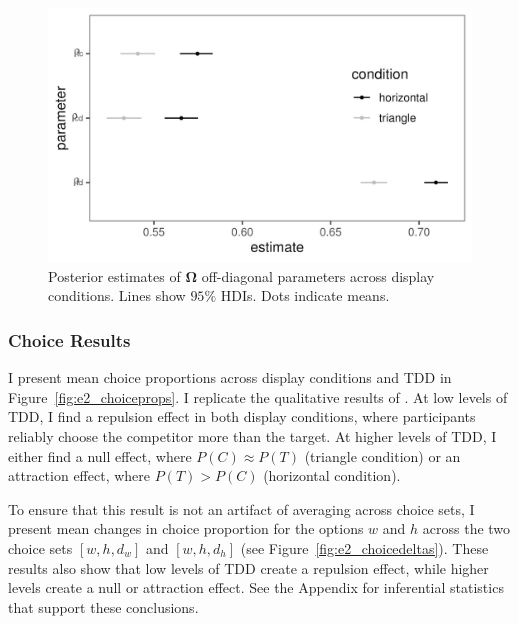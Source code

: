 \begin{figure}
   \includegraphics[width=\textwidth]{figures/bayes_circle_area_sigma_constant_comp_effect_omega_plot.jpeg}
   \caption{Posterior estimates of $\boldsymbol{\Omega}$ off-diagonal parameters across display conditions. Lines show $95\%$ HDIs.  Dots indicate means.}
   \label{fig:e2_omega}
\end{figure}

\subsubsection{Choice Results}

I present mean choice proportions across display conditions and TDD in Figure~\ref{fig:e2_choiceprops}. I replicate the qualitative results of \textcite{spektorWhenGoodLooks2018b}. At low levels of TDD, I find a repulsion effect in both display conditions, where participants reliably choose the competitor more than the target. At higher levels of TDD, I either find a null effect, where $P(C) \approx P(T)$ (triangle condition) or an attraction effect, where $P(T)>P(C)$ (horizontal condition). 

To ensure that this result is not an artifact of averaging across choice sets, I present mean changes in choice proportion for the options $w$ and $h$ across the two choice sets $[w,h,d_{w}]$ and $[w,h,d_{h}]$ (see Figure~\ref{fig:e2_choicedeltas}). These results also show that low levels of TDD create a repulsion effect, while higher levels create a null or attraction effect. See the Appendix for inferential statistics that support these conclusions.

